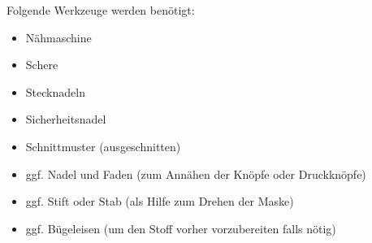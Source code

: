 \documentclass[12pt,parskip=full]{scrartcl}
\begin{document}
Folgende Werkzeuge werden benötigt:
\begin{itemize}
    \item Nähmaschine
    \item Schere
    \item Stecknadeln
    \item Sicherheitsnadel
    \item Schnittmuster (ausgeschnitten)
    \item ggf. Nadel und Faden (zum Annähen der Knöpfe oder Druckknöpfe)
    \item ggf. Stift oder Stab (als Hilfe zum Drehen der Maske)
    \item ggf. Bügeleisen (um den Stoff vorher vorzubereiten falls nötig)
\end{itemize}

\clearpage
\end{document}
